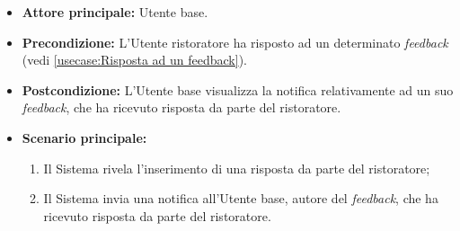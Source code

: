\label{usecase:Visualizza notifica risposta feedback}
\begin{itemize}
	\item \textbf{Attore principale:} Utente base.

	\item \textbf{Precondizione:} L'Utente ristoratore ha risposto ad un determinato \textit{feedback} (vedi \autoref{usecase:Risposta ad un feedback}).


	\item \textbf{Postcondizione:} L'Utente base visualizza la notifica relativamente ad un suo \textit{feedback}, che ha ricevuto risposta da parte del ristoratore.

	\item \textbf{Scenario principale:}
	      \begin{enumerate}
		      \item Il Sistema rivela l'inserimento di una risposta da parte del ristoratore;

		      \item Il Sistema invia una notifica all'Utente base, autore del \textit{feedback}, che ha ricevuto risposta da parte del ristoratore.
	      \end{enumerate}
\end{itemize}
